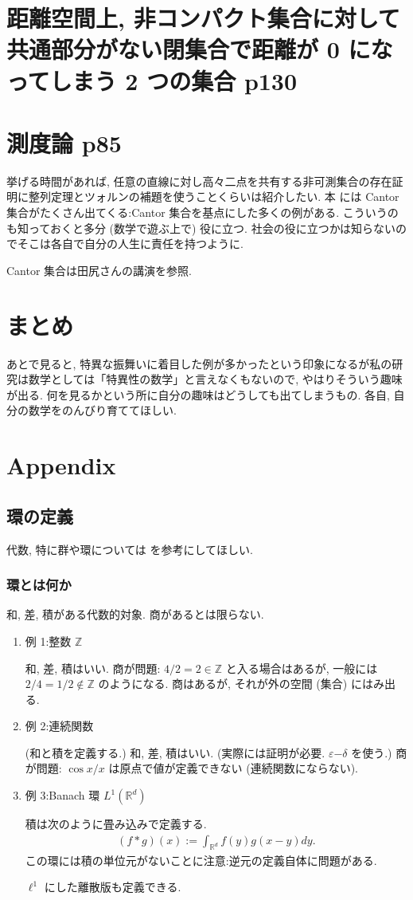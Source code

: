 \documentclass[openany, a4paper, oneside]{jsbook}
\begin{document}
\section{距離空間上, 非コンパクト集合に対して共通部分がない閉集合で距離が 0 になってしまう 2 つの集合 \cite{GelbaumOlmsted1} p130}

\section{測度論 \cite{GelbaumOlmsted1} p85}

挙げる時間があれば, 任意の直線に対し高々二点を共有する非可測集合の存在証明に整列定理とツォルンの補題を使うことくらいは紹介したい.
本 \cite{GelbaumOlmsted1} には Cantor 集合がたくさん出てくる:Cantor 集合を基点にした多くの例がある.
こういうのも知っておくと多分 (数学で遊ぶ上で) 役に立つ.
社会の役に立つかは知らないのでそこは各自で自分の人生に責任を持つように.

Cantor 集合は田尻さんの講演を参照.
\section{まとめ}

あとで見ると, 特異な振舞いに着目した例が多かったという印象になるが私の研究は数学としては「特異性の数学」と言えなくもないので,
やはりそういう趣味が出る.
何を見るかという所に自分の趣味はどうしても出てしまうもの.
各自, 自分の数学をのんびり育ててほしい.
\section{Appendix}

\subsection{環の定義}

代数, 特に群や環については \cite{ToshiyukiKatsura1} を参考にしてほしい.
\subsubsection{環とは何か}

和, 差, 積がある代数的対象.
商があるとは限らない.
\begin{enumerate}
\item 例 1:整数 $\mathbb{Z}$

和, 差, 積はいい.
商が問題: $4/2 = 2 \in \mathbb{Z}$ と入る場合はあるが, 一般には $2/4 = 1/2 \notin \mathbb{Z}$ のようになる.
商はあるが, それが外の空間 (集合) にはみ出る.
\item 例 2:連続関数

(和と積を定義する.)
和, 差, 積はいい. (実際には証明が必要. $\varepsilon \mathrm{-} \delta$ を使う.)
商が問題: $\cos x / x$ は原点で値が定義できない (連続関数にならない).
\item 例 3:Banach 環 $L^1 (\mathbb{R}^d)$

積は次のように畳み込みで定義する.
\begin{align}
 (f*g) (x)
 :=
 \int_{\mathbb{R}^d} f (y) g (x - y) dy.
\end{align}
この環には積の単位元がないことに注意:逆元の定義自体に問題がある.

$\ell^1$ にした離散版も定義できる.
\end{enumerate}
\end{document}
